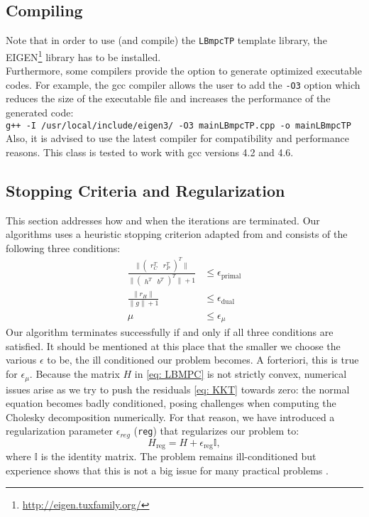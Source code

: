 \documentclass[letter]{article}
\begin{document}
\begin{sffamily}
\subsection{Compiling}
Note that in order to use (and compile) the \texttt{LBmpcTP} template library, the EIGEN\footnote{\url{http://eigen.tuxfamily.org/}} library has to be installed.\\

\noindent
Furthermore, some compilers provide the option to generate optimized executable codes. For example, the gcc compiler allows the user to add the \texttt{-O3} option which  reduces the size of the executable file and increases the performance of the generated code: \\
\noindent
\texttt{g++ -I /usr/local/include/eigen3/ -O3 mainLBmpcTP.cpp -o mainLBmpcTP} \\

\noindent
Also, it is advised to use the latest compiler for compatibility and performance reasons. This class is tested to work with gcc versions 4.2 and 4.6.

\subsection{Stopping Criteria and Regularization}
This section addresses how and when the iterations are terminated. Our algorithms uses a heuristic stopping criterion adapted from \citep{Gertz2003OOQP, VanderbreiLOQO} and consists of the following three conditions:
\begin{align}
\label{eq: stoppingCriteria}
	\frac{\| \begin{pmatrix}   r_C^T & r_P^T  \end{pmatrix}^T \|}{ \| \begin{pmatrix} h^T & b^T \end{pmatrix}^T \|+1    } &\leq \epsilon_\text{primal} \\
	\frac{\|r_H\|}{\|g\|+1} &\leq \epsilon_\text{dual}	\nonumber  \\
	\mu &\leq \epsilon_\mu \nonumber 
\end{align}
Our algorithm terminates successfully if and only if all three conditions are satisfied. It should be mentioned at this place that the smaller we choose the various $\epsilon$ to be, the ill conditioned our problem becomes. A forteriori, this is true for $\epsilon_\mu$. Because the matrix $H$ in \eqref{eq: LBMPC} is not strictly convex, numerical issues arise as we try to push the residuals \eqref{eq: KKT} towards zero: the normal equation becomes badly conditioned, posing challenges when computing the Cholesky decomposition numerically. For that reason, we have introduced a regularization parameter $\epsilon_{reg}$ (\texttt{reg}) that regularizes our problem to:
\begin{equation}
\label{eq: regularization}
	H_\text{reg} = H + \epsilon_\text{reg}\mathbb{I},
\end{equation}
where $\mathbb{I}$ is the identity matrix. The problem remains ill-conditioned but experience shows that this is not a big issue for many practical problems \citep{Wright1997StabAugSystemFact, Wright1995StabilityLinEqSolversIPM}.


\end{sffamily}
\end{document}
